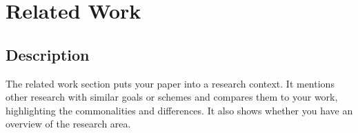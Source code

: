 \section{Related Work}
\label{sec:related-work}
\subsection{Description}
The related work section puts your paper into a research
context. It mentions other research with similar goals or
schemes and compares them to your work, highlighting the
commonalities and differences. It also shows whether you have
an overview of the research area.
